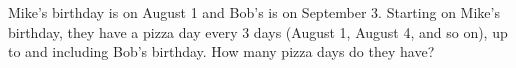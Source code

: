 Mike's birthday is on August 1 and Bob's is on September 3. Starting on Mike's birthday, they have a pizza day every $3$ days (August 1, August 4, and so on), up to and including Bob's birthday. How many pizza days do they have?
